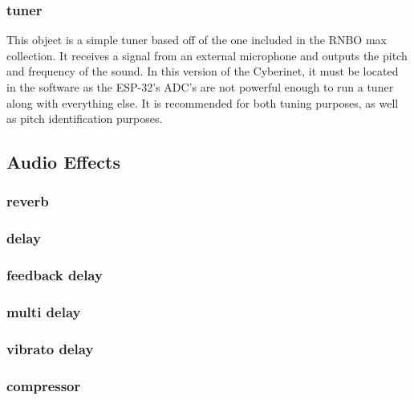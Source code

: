 \subsubsection{tuner}
\vspace{5mm}
This object is a simple tuner based off of the one included in the RNBO max collection. It receives a signal from an external microphone and outputs the pitch and frequency of the sound. In this version of the Cyberinet, it must be located in the software as the ESP-32's ADC's are not powerful enough to run a tuner along with everything else. It is recommended for both tuning purposes, as well as pitch identification purposes. 

\subsection{Audio Effects}


\subsubsection{reverb}
\vspace{5mm}

\subsubsection{delay}
\vspace{5mm}

\subsubsection{feedback delay}
\vspace{5mm}

\subsubsection{multi delay}
\vspace{5mm}

\subsubsection{vibrato delay}
\vspace{5mm}

\subsubsection{compressor}
\vspace{5mm}

